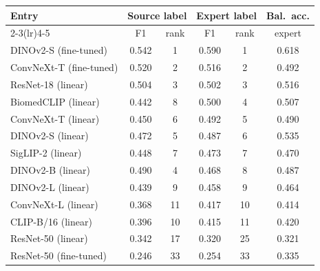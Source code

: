 \begin{tabular}{@{}lccccc@{}}\toprule
Entry & \multicolumn{2}{c}{Source label} & \multicolumn{2}{c}{Expert label} & Bal.\ acc.\\
\cmidrule(lr){2-3}\cmidrule(lr){4-5}
 & F1 & rank & F1 & rank & expert\\\midrule
DINOv2-S (fine-tuned) & 0.542 & 1 & 0.590 & 1 & 0.618\\
ConvNeXt-T (fine-tuned) & 0.520 & 2 & 0.516 & 2 & 0.492\\
ResNet-18 (linear) & 0.504 & 3 & 0.502 & 3 & 0.516\\
BiomedCLIP (linear) & 0.442 & 8 & 0.500 & 4 & 0.507\\
ConvNeXt-T (linear) & 0.450 & 6 & 0.492 & 5 & 0.490\\
DINOv2-S (linear) & 0.472 & 5 & 0.487 & 6 & 0.535\\
SigLIP-2 (linear) & 0.448 & 7 & 0.473 & 7 & 0.470\\
DINOv2-B (linear) & 0.490 & 4 & 0.468 & 8 & 0.487\\
DINOv2-L (linear) & 0.439 & 9 & 0.458 & 9 & 0.464\\
ConvNeXt-L (linear) & 0.368 & 11 & 0.417 & 10 & 0.414\\
CLIP-B/16 (linear) & 0.396 & 10 & 0.415 & 11 & 0.420\\
ResNet-50 (linear) & 0.342 & 17 & 0.320 & 25 & 0.321\\
ResNet-50 (fine-tuned) & 0.246 & 33 & 0.254 & 33 & 0.335\\
\bottomrule\end{tabular}

